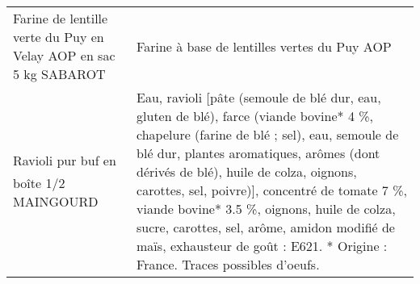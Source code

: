 \begin{longtable}{p{5cm}p{10cm}}
                                         Farine de lentille verte du Puy en Velay AOP en sac 5 kg SABAROT &                                                                                                                                                                                                                                                                                                                                                                                                                                                                                                                                                                                                                                                                                                                                                                                                                                                                                                                                                                                             Farine à base de lentilles vertes du Puy AOP \\
                                                                  Ravioli pur buf en boîte 1/2 MAINGOURD &                                                                                                                                                                                                                                                                                                                                                                                                                                                                                                                                                                            Eau, ravioli [pâte (semoule de blé dur, eau, gluten de blé), farce (viande bovine* 4 \%, chapelure (farine de blé ; sel), eau, semoule de blé dur, plantes aromatiques, arômes (dont dérivés de blé), huile de colza, oignons, carottes, sel, poivre)], concentré de tomate 7 \%, viande bovine* 3.5 \%, oignons, huile de colza, sucre, carottes, sel, arôme, amidon modifié de maïs, exhausteur de goût : E621. * Origine : France.  Traces possibles d'oeufs. \\

\end{longtable}
